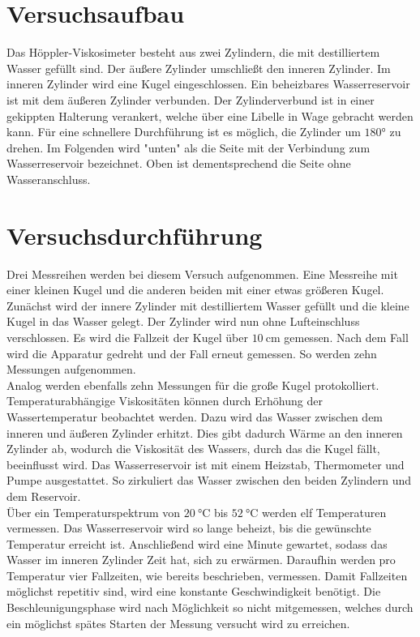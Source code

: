 %

%
\section{Versuchsaufbau}
Das Höppler-Viskosimeter besteht aus zwei Zylindern, die mit destilliertem Wasser gefüllt sind. 
Der äußere Zylinder umschließt den inneren Zylinder. Im inneren Zylinder wird eine Kugel 
eingeschlossen. Ein beheizbares Wasserreservoir ist mit dem äußeren Zylinder verbunden. 
Der Zylinderverbund ist in einer gekippten Halterung verankert, welche über eine Libelle 
in Wage gebracht werden kann. Für eine schnellere Durchführung ist es möglich, die Zylinder um 
$\ang{180;;}$ zu drehen. Im Folgenden wird "unten" als die Seite mit der Verbindung zum Wasserreservoir 
bezeichnet. Oben ist dementsprechend die Seite ohne Wasseranschluss. 


\section{Versuchsdurchführung}
Drei Messreihen werden bei diesem Versuch aufgenommen. Eine Messreihe mit einer kleinen Kugel 
und die anderen beiden mit einer etwas größeren Kugel. Zunächst wird der innere Zylinder mit  
destilliertem Wasser gefüllt und die kleine Kugel in das Wasser gelegt. Der Zylinder wird nun 
ohne Lufteinschluss verschlossen. Es wird die Fallzeit der Kugel über $\qty{10}{\centi \meter}$
gemessen. Nach dem Fall wird die Apparatur gedreht und der Fall erneut gemessen. So werden zehn 
Messungen aufgenommen.\\
\noindent Analog werden ebenfalls zehn Messungen für die große Kugel protokolliert. \\
\noindent Temperaturabhängige Viskositäten können durch Erhöhung der Wassertemperatur beobachtet werden. 
Dazu wird das Wasser zwischen dem inneren und äußeren Zylinder erhitzt. Dies gibt dadurch Wärme 
an den inneren Zylinder ab, wodurch die Viskosität des Wassers, durch das die Kugel fällt, beeinflusst wird.
Das Wasserreservoir ist mit einem Heizstab, Thermometer und Pumpe ausgestattet. So zirkuliert das Wasser 
zwischen den beiden Zylindern und dem Reservoir.\\
Über ein Temperaturspektrum von $\qty{20}{\celsius}$ bis $\qty{52}{\celsius}$ werden elf Temperaturen vermessen. 
Das Wasserreservoir wird so lange beheizt, bis die gewünschte Temperatur erreicht ist. Anschließend wird eine 
Minute gewartet, sodass das Wasser im inneren Zylinder Zeit hat, sich zu erwärmen. Daraufhin werden pro Temperatur 
vier Fallzeiten, wie bereits beschrieben, vermessen.
Damit Fallzeiten möglichst repetitiv sind, wird eine konstante Geschwindigkeit benötigt. Die Beschleunigungsphase wird 
nach Möglichkeit so nicht mitgemessen, welches durch ein möglichst spätes Starten der Messung versucht wird zu erreichen.



